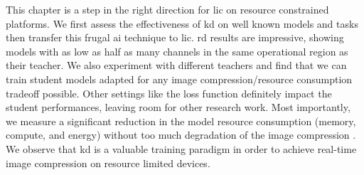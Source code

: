 This chapter is a step in the right direction for \acrshort{lic} on resource constrained platforms. We first assess the effectiveness of \acrshort{kd} on well known models and tasks then transfer this frugal \acrshort{ai} technique to \acrshort{lic}. \acrshort{rd} results are impressive, showing models with as low as half as many channels in the same operational region as their teacher. We also experiment with different teachers and find that we can train student models adapted for any image compression/resource consumption tradeoff possible. Other settings like the loss function definitely impact the student performances, leaving room for other research work. Most importantly, we measure a significant reduction in the model resource consumption (memory, compute, and energy) without too much degradation of the image compression . We observe that \acrshort{kd} is a valuable training paradigm in order to achieve real-time image compression on resource limited devices.